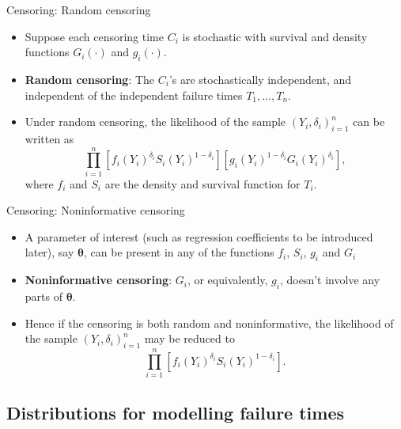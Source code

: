 \documentclass{beamer}
\newcommand{\boldtheta}{{\boldsymbol \theta}}
\newenvironment{wideitemize}%
  {\begin{itemize}%
    \setlength{\parskip}{1em}}%
  {\end{itemize}}
\newcommand{\currentsubsection}{}
\let\oldsubsection\subsection
\renewcommand{\subsection}[1]{\oldsubsection{#1}\renewcommand{\currentsubsection}{#1}}
\begin{document}
\begin{frame} {Censoring:  Random  censoring}

\begin{wideitemize}
\item Suppose each censoring time $C_i$ is stochastic with survival and density functions $G_i(\cdot)$ and $g_i(\cdot)$.

\item {\bf Random censoring}: The $C_i$'s are  stochastically independent, and independent of the independent failure times $T_1, \dots, T_n$.

\item Under random censoring, the likelihood of the sample $(Y_i, \delta_i)_{i =1}^n$ can be written as
\[
\prod_{i =1}^n [f_i (Y_i)^{\delta_i}S_i (Y_i)^{1 - \delta_i}] [  g_i (Y_i)^{1 -\delta_i}G_i (Y_i)^{\delta_i}   ],
\]
where $f_i$ and $S_i$ are the density and survival function for $T_i$. 


\end{wideitemize}


\end{frame}



\begin{frame} {Censoring:  Noninformative  censoring}

\begin{wideitemize}

\item A parameter of interest (such as regression coefficients to be introduced later), say $\boldtheta$, can be present in any of the functions $f_i$, $S_i$, $g_i$ and $G_i$

\item {\bf Noninformative censoring}: $G_i$, or equivalently, $g_i$, doesn't involve any parts of $\boldtheta$.



\item Hence if the censoring is both random and noninformative, the likelihood of the sample $(Y_i, \delta_i)_{i =1}^n$ may be reduced to
\[
\prod_{i =1}^n [f_i (Y_i)^{\delta_i}S_i (Y_i)^{1 - \delta_i}].
\]

\end{wideitemize}


\end{frame}


%


\subsection{Distributions for modelling failure times}
\end{document}
